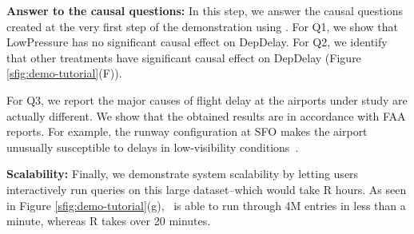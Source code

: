      {\bf Answer to the causal questions:} %
In this step,  we answer the causal questions created at the very first step of the demonstration using
\GSQL. For Q1, we show that LowPressure has no significant causal effect on DepDelay.
For Q2, we identify that other treatments have significant causal effect on DepDelay
 (Figure \ref{sfig:demo-tutorial}(F)).
For Q3, we report the major causes of flight delay at the airports under study are
     actually different. We show that the obtained results are in accordance with
FAA reports. %
For example, the runway configuration at SFO makes the airport
unusually susceptible to delays in low-visibility conditions~\cite{faa-sfo}.





{\bf Scalability:} Finally, we demonstrate system
  scalability by letting users interactively run queries on this large
   dataset--which would take R hours. As seen in Figure \ref{sfig:demo-tutorial}(g),
\GSQL\ is able to run through 4M entries in less than a minute, whereas
R takes over 20 minutes.

